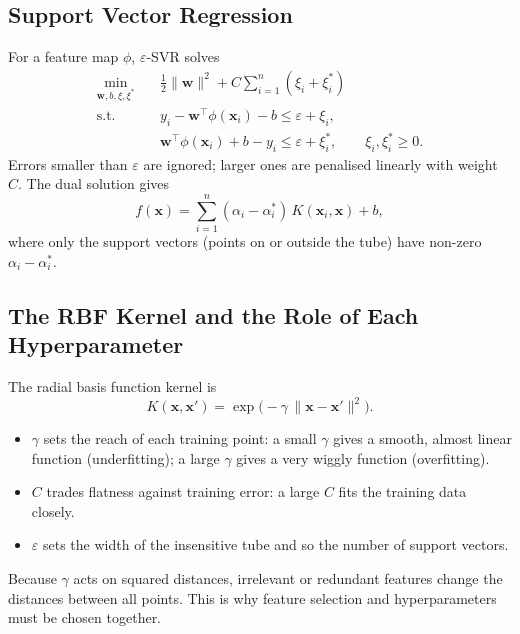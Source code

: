 \documentclass[12pt,a4paper]{article}
\numberwithin{equation}{section}
\numberwithin{table}{section}
\numberwithin{figure}{section}
\begin{document}
\subsection{Support Vector Regression}
For a feature map $\phi$, $\varepsilon$-SVR \cite{smola2004} solves
\begin{align}
  \min_{\mathbf{w}, b, \xi, \xi^*} \quad & \tfrac{1}{2}\|\mathbf{w}\|^2 + C \sum_{i=1}^{n} (\xi_i + \xi_i^*) \\
  \text{s.t.} \quad & y_i - \mathbf{w}^\top\phi(\mathbf{x}_i) - b \le \varepsilon + \xi_i, \\
  & \mathbf{w}^\top\phi(\mathbf{x}_i) + b - y_i \le \varepsilon + \xi_i^*, \qquad \xi_i, \xi_i^* \ge 0 .
\end{align}
Errors smaller than $\varepsilon$ are ignored; larger ones are penalised linearly with weight $C$. The dual solution gives
\begin{equation}
  f(\mathbf{x}) = \sum_{i=1}^{n} (\alpha_i - \alpha_i^*)\, K(\mathbf{x}_i, \mathbf{x}) + b,
\end{equation}
where only the support vectors (points on or outside the tube) have non-zero $\alpha_i - \alpha_i^*$.

\subsection{The RBF Kernel and the Role of Each Hyperparameter}
The radial basis function kernel is
\begin{equation}
  K(\mathbf{x}, \mathbf{x}') = \exp\!\big(-\gamma \, \|\mathbf{x} - \mathbf{x}'\|^2\big).
\end{equation}
\begin{itemize}
  \item \textbf{$\gamma$} sets the reach of each training point: a small $\gamma$ gives a smooth, almost linear function (underfitting); a large $\gamma$ gives a very wiggly function (overfitting).
  \item \textbf{$C$} trades flatness against training error: a large $C$ fits the training data closely.
  \item \textbf{$\varepsilon$} sets the width of the insensitive tube and so the number of support vectors.
\end{itemize}
Because $\gamma$ acts on squared distances, irrelevant or redundant features change the distances between all points. This is why feature selection and hyperparameters must be chosen together.
\end{document}
